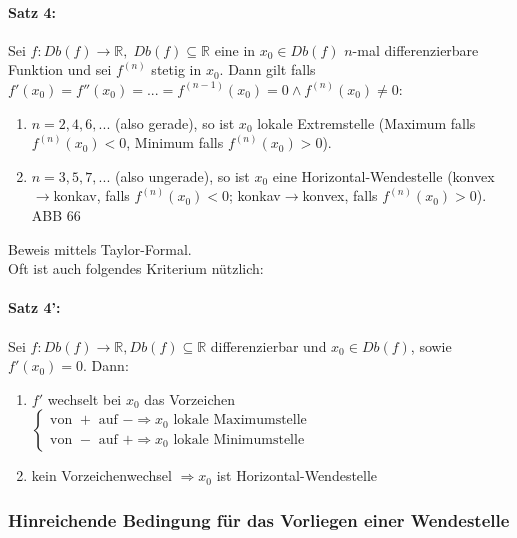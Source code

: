 \paragraph{Satz 4:} Sei $f:Db(f) \to \mathbb{R} , \; Db(f) \subseteq \mathbb{R}$ eine in $x_0 \in Db(f)$ $n$-mal differenzierbare Funktion und sei $f^{(n)}$ stetig in $x_0$. Dann gilt falls $f'(x_0)=f''(x_0)=...=f^{(n-1)}(x_0)=0 \wedge f^{(n)}(x_0)\not = 0$:
\begin{enumerate}[label=\alph*.)]
\item $n=2,4,6,...$ (also gerade), so ist $x_0$ lokale Extremstelle (Maximum falls $f^{(n)}(x_0)<0$, Minimum falls $f^{(n)}(x_0)>0$).
\item $n=3,5,7,...$ (also ungerade), so ist $x_0$ eine Horizontal-Wendestelle (konvex$\to$konkav, falls $f^{(n)}(x_0)<0$; konkav$\to$konvex, falls $f^{(n)}(x_0)>0$).\\
ABB 66
\end{enumerate}
Beweis mittels Taylor-Formal.\\
Oft ist auch folgendes Kriterium nützlich:
\paragraph{Satz 4':} Sei $f:Db(f)\to \mathbb{R}, Db(f) \subseteq \mathbb{R}$ differenzierbar und $x_0\in Db(f)$, sowie $f'(x_0)=0$. Dann:
\begin{enumerate}[label=\alph*.)]
\item $f'$ wechselt bei $x_0$ das Vorzeichen $\begin{cases}
\text{von }+ \text{ auf }- \Rightarrow x_0 \text{ lokale Maximumstelle}\\
\text{von }- \text{ auf }+ \Rightarrow x_0 \text{ lokale Minimumstelle}
\end{cases}$
\item kein Vorzeichenwechsel $\Rightarrow x_0$ ist Horizontal-Wendestelle
\end{enumerate}
\subsubsection*{Hinreichende Bedingung für das Vorliegen einer Wendestelle}


